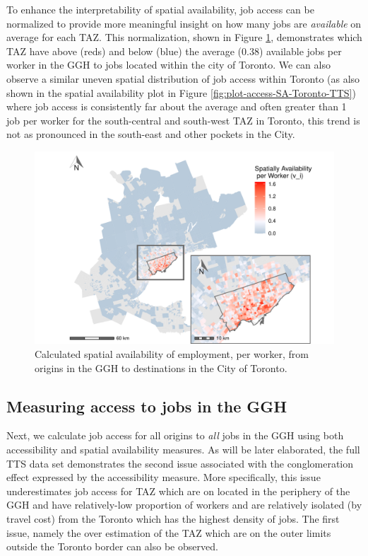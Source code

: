 \documentclass[]{elsarticle} %
\begin{document}
To enhance the interpretability of spatial availability, job access can
be normalized to provide more meaningful insight on how many jobs are
\emph{available} on average for each TAZ. This normalization, shown in
Figure \ref{fig:plot-avail-Toronto-TTS-per-worker}, demonstrates which
TAZ have above (reds) and below (blue) the average (0.38) available jobs
per worker in the GGH to jobs located within the city of Toronto. We can
also observe a similar uneven spatial distribution of job access within
Toronto (as also shown in the spatial availability plot in Figure
\ref{fig:plot-access-SA-Toronto-TTS}) where job access is consistently
far about the average and often greater than 1 job per worker for the
south-central and south-west TAZ in Toronto, this trend is not as
pronounced in the south-east and other pockets in the City.

\begin{figure}
\includegraphics[width=1\linewidth]{Spatial-Availability_files/figure-latex/plot-avail-Toronto-TTS-per-worker-1} \caption{\label{fig:plot-avail-Toronto-TTS-per-worker}Calculated spatial availability of employment, per worker, from origins in the GGH to destinations in the City of Toronto.}\label{fig:plot-avail-Toronto-TTS-per-worker}
\end{figure}

\newpage

\hypertarget{measuring-access-to-jobs-in-the-ggh}{%
\subsection{Measuring access to jobs in the
GGH}\label{measuring-access-to-jobs-in-the-ggh}}

Next, we calculate job access for all origins to \emph{all} jobs in the
GGH using both accessibility and spatial availability measures. As will
be later elaborated, the full TTS data set demonstrates the second issue
associated with the conglomeration effect expressed by the accessibility
measure. More specifically, this issue underestimates job access for TAZ
which are on located in the periphery of the GGH and have relatively-low
proportion of workers and are relatively isolated (by travel cost) from
the Toronto which has the highest density of jobs. The first issue,
namely the over estimation of the TAZ which are on the outer limits
outside the Toronto border can also be observed.
\end{document}

